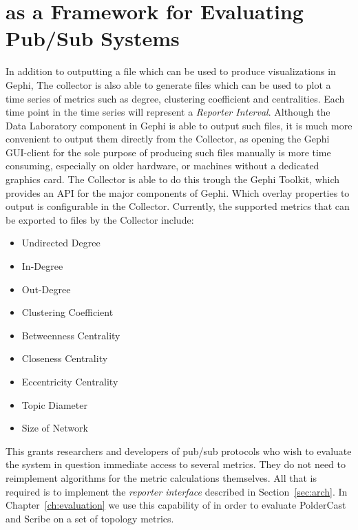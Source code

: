 
\section{\demo as a Framework for Evaluating Pub/Sub Systems}
\label{sec:viz_eval}

In addition to outputting a \gexf file which can be used to produce
visualizations in Gephi, The collector is also able to generate \csv
files which can be used to plot a time series of metrics such as degree,
clustering coefficient and centralities. Each time point in the time
series will represent a \emph{Reporter Interval}. Although the Data
Laboratory component in Gephi is able to output such \csv files, it is
much more convenient to output them directly from the Collector, as
opening the Gephi GUI-client for the sole purpose of producing such
files manually is more time consuming, especially on older hardware, or
machines without a dedicated graphics card. The Collector is able to do
this trough the Gephi Toolkit, which provides an API for the major
components of Gephi. Which overlay properties to
output is configurable in the Collector.  Currently, the supported
metrics that can be exported to \csv files by the Collector include:

\begin{itemize}
    \item Undirected Degree
    \item In-Degree
    \item Out-Degree
    \item Clustering Coefficient
    \item Betweenness Centrality
    \item Closeness Centrality
    \item Eccentricity Centrality
    \item Topic Diameter
    \item Size of Network
\end{itemize}

This grants researchers and developers of pub/sub protocols who wish to evaluate
the system in question immediate access to several metrics. They do not need to
reimplement algorithms for the metric calculations themselves. All that is
required is to implement the \emph{reporter interface} described in
Section~\ref{sec:arch}. In Chapter~\ref{ch:evaluation} we use this capability of \demo in
order to evaluate PolderCast and Scribe on a set of topology metrics.

